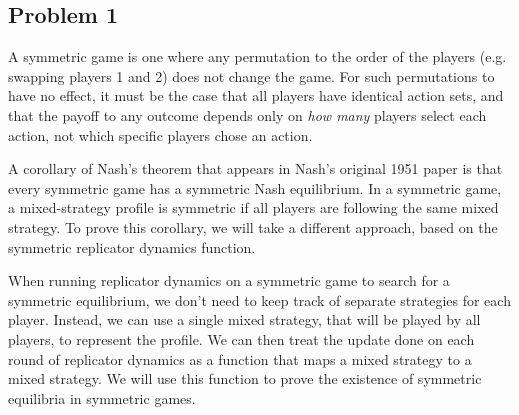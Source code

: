 \documentclass[11pt]{article}
\newcommand{\titlebox}[4]{
    \begin{center}
        \framebox{
            \vbox{
            \hbox to \textwidth { #1 \hfill #3}
            \vspace{-4mm}
            \hbox to \textwidth {\hfill \Large \bf #2 \hfill}
            \hbox to \textwidth { {\it \hfill Due #4 \hfill} }
        }
    }
    \end{center}
}
\begin{document}
\titlebox{CSC 383}
{Homework 5}
{\textcolor{red}{your names go here}} %
{April 3\textsuperscript{rd}, 2020}



\subsection*{Problem 1}

A symmetric game is one where any permutation to the order of the players (e.g. swapping players 1 and 2) does not change the game.
For such permutations to have no effect, it must be the case that all players have identical action sets, and that the payoff to any outcome depends only on \emph{how many} players select each action, not which specific players chose an action.

A corollary of Nash's theorem that appears in Nash's original 1951 paper is that every symmetric game has a symmetric Nash equilibrium.
In a symmetric game, a mixed-strategy profile is symmetric if all players are following the same mixed strategy.
To prove this corollary, we will take a different approach, based on the symmetric replicator dynamics function.

When running replicator dynamics on a symmetric game to search for a symmetric equilibrium, we don't need to keep track of separate strategies for each player.
Instead, we can use a single mixed strategy, that will be played by all players, to represent the profile.
We can then treat the update done on each round of replicator dynamics as a function that maps a mixed strategy to a mixed strategy.
We will use this function to prove the existence of symmetric equilibria in symmetric games.
\end{document}
